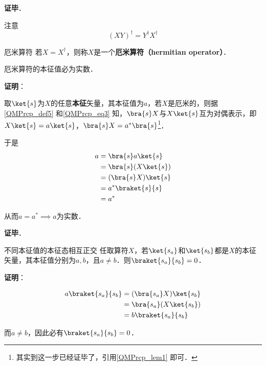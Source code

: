 \textbf{证毕}．




注意
\begin{equation}
(XY)^\dagger = Y^\dagger X^\dagger
\end{equation}


\begin{definition}{厄米算符}\label{QMPrcp_def12}
若$X=X^\dagger$，则称$X$是一个\textbf{厄米算符（hermitian operator）}．
\end{definition}

\begin{theorem}{}\label{QMPrcp_the2}
厄米算符的本征值必为实数．
\end{theorem}

\textbf{证明}：

取$\ket{s}$为$X$的任意\textbf{本征}矢量，其本征值为$a$，若$X$是厄米的，则据\autoref{QMPrcp_def5} 和\autoref{QMPrcp_eq3} 知，$\bra{s}X$与$X\ket{s}$互为对偶表示，即$X\ket{s}=a\ket{s}$，$\bra{s}X=a^*\bra{s}$\footnote{其实到这一步已经证毕了，引用\autoref{QMPrcp_lem1} 即可．}．

于是
\begin{equation}
\begin{aligned}
a&=\bra{s}a\ket{s}\\
&=\bra{s}(X\ket{s})\\
&=(\bra{s}X)\ket{s}\\
&=a^*\braket{s}{s}\\
&=a^*
\end{aligned}
\end{equation}

从而$a=a^*\implies a$为实数．

\textbf{证毕}．


\begin{theorem}{不同本征值的本征态相互正交}\label{QMPrcp_the3}
任取算符$X$，若$\ket{s_a}$和$\ket{s_b}$都是$X$的本征矢量，其本征值分别为$a,b$，且$a\neq b$．则$\braket{s_a}{s_b}=0$．
\end{theorem}

\textbf{证明}：

\begin{equation}
\begin{aligned}
a\braket{s_a}{s_b}&=(\bra{s_a}X)\ket{s_b}\\
&=\bra{s_a}(X\ket{s_b})\\
&=b\braket{s_a}{s_b}
\end{aligned}
\end{equation}

而$a\neq b$，因此必有$\braket{s_a}{s_b}=0$．

